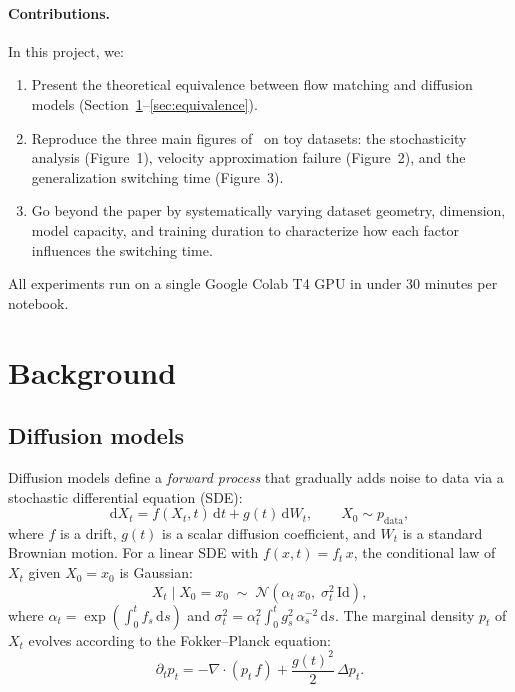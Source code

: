 \documentclass[10pt,a4paper]{article}
\theoremstyle{definition}
\newcommand{\cN}{\mathcal{N}}
\newcommand{\dd}{\mathrm{d}}
\newcommand{\Id}{\mathrm{Id}}
\begin{document}
\paragraph{Contributions.}
In this project, we:
\begin{enumerate}[leftmargin=1.5em,nosep]
    \item Present the theoretical equivalence between flow matching and diffusion models (Section~\ref{sec:background}--\ref{sec:equivalence}).
    \item Reproduce the three main figures of~\cite{bertrand2025closed} on toy datasets: the stochasticity analysis (Figure~1), velocity approximation failure (Figure~2), and the generalization switching time (Figure~3).
    \item Go beyond the paper by systematically varying dataset geometry, dimension, model capacity, and training duration to characterize how each factor influences the switching time.
\end{enumerate}

All experiments run on a single Google Colab T4 GPU in under 30 minutes per notebook.

\section{Background}\label{sec:background}

\subsection{Diffusion models}

Diffusion models define a \emph{forward process} that gradually adds noise to data via a stochastic differential equation (SDE):
\begin{equation}\label{eq:forward-sde}
    \dd X_t = f(X_t, t)\,\dd t + g(t)\,\dd W_t, \qquad X_0 \sim p_{\mathrm{data}},
\end{equation}
where $f$ is a drift, $g(t)$ is a scalar diffusion coefficient, and $W_t$ is a standard Brownian motion.
For a linear SDE with $f(x,t) = f_t\, x$, the conditional law of $X_t$ given $X_0 = x_0$ is Gaussian:
\[
    X_t \mid X_0 = x_0 \;\sim\; \cN(\alpha_t\, x_0,\; \sigma_t^2\, \Id),
\]
where $\alpha_t = \exp(\int_0^t f_s\,\dd s)$ and $\sigma_t^2 = \alpha_t^2 \int_0^t g_s^2\, \alpha_s^{-2}\,\dd s$.
The marginal density $p_t$ of $X_t$ evolves according to the Fokker--Planck equation:
\begin{equation}\label{eq:fp}
    \partial_t p_t = -\nabla\cdot(p_t\, f) + \frac{g(t)^2}{2}\,\Delta p_t.
\end{equation}
\end{document}
